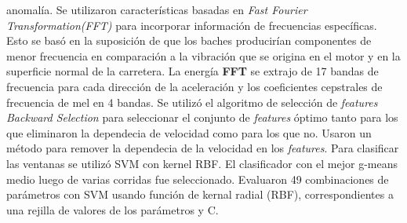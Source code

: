anomalía. Se utilizaron características basadas en \emph{Fast Fourier Transformation(FFT)} para incorporar información de frecuencias específicas. Esto se basó en la
suposición de que los baches producirían componentes de menor frecuencia en comparación a la vibración que se origina en el motor y en la superficie normal de la carretera.
La energía \textbf{FFT} se extrajo de 17 bandas de frecuencia para cada dirección de la aceleración y los coeficientes cepstrales de frecuencia de mel en 4 bandas. Se
utilizó el algoritmo de selección de \emph{features} \emph{Backward Selection} para seleccionar el conjunto de \emph{features} óptimo tanto para los que eliminaron la
dependecia de velocidad como para los que no. Usaron un método para remover la dependecia de la velocidad en los \emph{features}.  Para clasificar las ventanas 
se utilizó SVM con kernel RBF. El clasificador con el mejor g-means medio luego de varias corridas fue seleccionado. Evaluaron 49 combinaciones de parámetros con SVM
usando función de kernal radial (RBF), correspondientes a una rejilla de valores de los parámetros \gamma y C. 